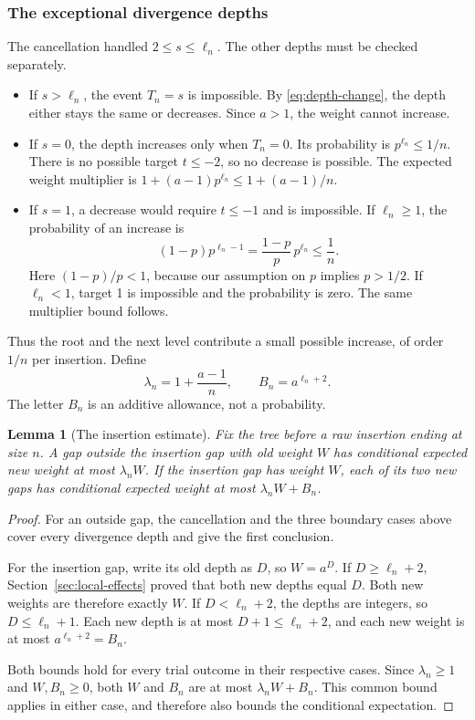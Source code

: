 \documentclass[11pt,a4paper]{article}
\theoremstyle{readable}
\newtheorem{lemma}[theorem]{Lemma}
\begin{document}
\subsubsection*{The exceptional divergence depths}
The cancellation handled $2\le s\le\ell_n$. The other depths
must be checked separately.
\begin{itemize}
  \item If $s>\ell_n$, the event $T_n=s$ is impossible. By
        \eqref{eq:depth-change}, the depth either stays the same or
        decreases. Since $a>1$, the weight cannot increase.
  \item If $s=0$, the depth increases only when $T_n=0$.
        Its probability is $p^{\ell_n}\le1/n$. There is no possible
        target $t\le-2$, so no decrease is possible. The expected
        weight multiplier is
        $1+(a-1)p^{\ell_n}\le1+(a-1)/n$.
  \item If $s=1$, a decrease would require $t\le-1$ and is
        impossible. If $\ell_n\ge1$, the probability of an increase is
        \[
          (1-p)p^{\ell_n-1}
             =\frac{1-p}{p}\,p^{\ell_n}\le\frac1n.
        \]
        Here $(1-p)/p<1$, because our assumption on $p$ implies
        $p>1/2$. If $\ell_n<1$, target 1 is impossible and the
        probability is zero. The same multiplier bound follows.
\end{itemize}
Thus the root and the next level contribute a small possible increase,
of order $1/n$ per insertion. Define
\begin{equation}
  \lambda_n=1+\frac{a-1}{n},\qquad
  B_n=a^{\ell_n+2}.
  \label{eq:lambda-B}
\end{equation}
The letter $B_n$ is an additive allowance, not a probability.

\begin{lemma}[The insertion estimate]
\label{lem:insertion}
Fix the tree before a raw insertion ending at size $n$. A gap outside
the insertion gap with old weight $W$ has conditional expected new
weight at most $\lambda_nW$. If the insertion gap has weight $W$,
each of its two new gaps has conditional expected weight at most
$\lambda_nW+B_n$.
\end{lemma}

\begin{proof}
For an outside gap, the cancellation and the three boundary cases
above cover every divergence depth and give the first conclusion.

For the insertion gap, write its old depth as $D$, so $W=a^D$.
If $D\ge\ell_n+2$, Section~\ref{sec:local-effects} proved that
both new depths equal $D$. Both new weights are therefore exactly $W$.
If $D<\ell_n+2$, the depths are integers, so $D\le\ell_n+1$.
Each new depth is at most $D+1\le\ell_n+2$, and each new weight
is at most $a^{\ell_n+2}=B_n$.

Both bounds hold for every trial outcome in their respective cases.
Since $\lambda_n\ge1$ and $W,B_n\ge0$, both $W$ and $B_n$ are
at most $\lambda_nW+B_n$. This common bound applies in either case,
and therefore also bounds the conditional expectation.
\end{proof}
\end{document}
